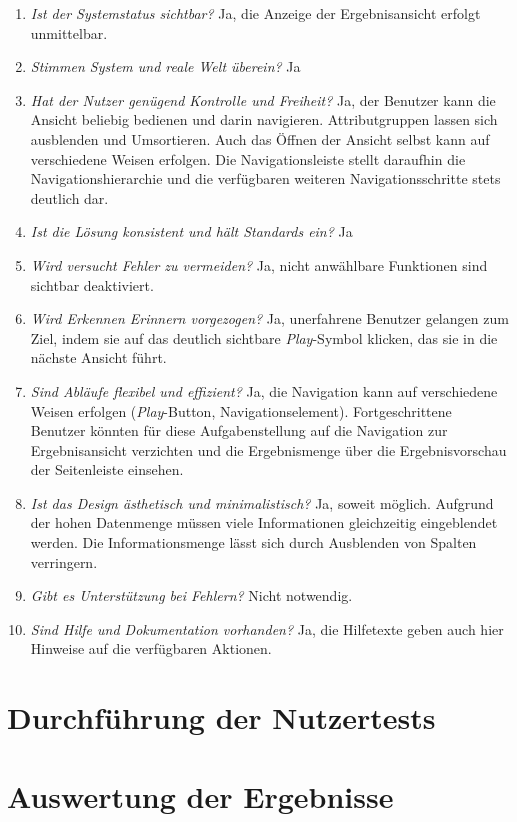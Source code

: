\begin{enumerate}
 \item \textit{Ist der Systemstatus sichtbar?} Ja, die Anzeige der Ergebnisansicht erfolgt unmittelbar.
 \item \textit{Stimmen System und reale Welt überein?} Ja
 \item \textit{Hat der Nutzer genügend Kontrolle und Freiheit?} Ja, der Benutzer kann die Ansicht beliebig bedienen und darin navigieren. Attributgruppen lassen sich ausblenden und Umsortieren. Auch das Öffnen der Ansicht selbst kann auf verschiedene Weisen erfolgen. Die Navigationsleiste stellt daraufhin die Navigationshierarchie und die verfügbaren weiteren Navigationsschritte stets deutlich dar.
 \item \textit{Ist die Lösung konsistent und hält Standards ein?} Ja
 \item \textit{Wird versucht Fehler zu vermeiden?} Ja, nicht anwählbare Funktionen sind sichtbar deaktiviert.
 \item \textit{Wird Erkennen Erinnern vorgezogen?} Ja, unerfahrene Benutzer gelangen zum Ziel, indem sie auf das deutlich sichtbare \textit{Play}-Symbol klicken, das sie in die nächste Ansicht führt.
 \item \textit{Sind Abläufe flexibel und effizient?} Ja, die Navigation kann auf verschiedene Weisen erfolgen (\textit{Play}-Button, Navigationselement). Fortgeschrittene Benutzer könnten für diese Aufgabenstellung auf die Navigation zur Ergebnisansicht verzichten und die Ergebnismenge über die Ergebnisvorschau der Seitenleiste einsehen.
 \item \textit{Ist das Design ästhetisch und minimalistisch?} Ja, soweit möglich. Aufgrund der hohen Datenmenge müssen viele Informationen gleichzeitig eingeblendet werden. Die Informationsmenge lässt sich durch Ausblenden von Spalten verringern.
 \item \textit{Gibt es Unterstützung bei Fehlern?} Nicht notwendig.
 \item \textit{Sind Hilfe und Dokumentation vorhanden?} Ja, die Hilfetexte geben auch hier Hinweise auf die verfügbaren Aktionen.
\end{enumerate}

\section{Durchführung der Nutzertests} \label{sec:testExecution}

\section{Auswertung der Ergebnisse} \label{sec:analysisConclusion}

